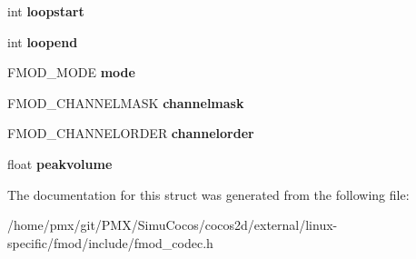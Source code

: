 \begin{DoxyCompactItemize}
int {\bfseries loopstart}
\item 
\mbox{\label{structFMOD__CODEC__WAVEFORMAT_af6fe45ead433ef4bdb8d3e74859900f2}} 
int {\bfseries loopend}
\item 
\mbox{\label{structFMOD__CODEC__WAVEFORMAT_a1f23ba212c380e08e9d0b83f16a00320}} 
F\+M\+O\+D\+\_\+\+M\+O\+DE {\bfseries mode}
\item 
\mbox{\label{structFMOD__CODEC__WAVEFORMAT_a5ef3ccd8b66efab89177fb7f02de8a3e}} 
F\+M\+O\+D\+\_\+\+C\+H\+A\+N\+N\+E\+L\+M\+A\+SK {\bfseries channelmask}
\item 
\mbox{\label{structFMOD__CODEC__WAVEFORMAT_a95f5ba661ea00c1a6ab06092f9bc9fac}} 
F\+M\+O\+D\+\_\+\+C\+H\+A\+N\+N\+E\+L\+O\+R\+D\+ER {\bfseries channelorder}
\item 
\mbox{\label{structFMOD__CODEC__WAVEFORMAT_a4bf4a9aeb4628e4eec7ff239453bb4e7}} 
float {\bfseries peakvolume}
\end{DoxyCompactItemize}


The documentation for this struct was generated from the following file\+:\begin{DoxyCompactItemize}
\item 
/home/pmx/git/\+P\+M\+X/\+Simu\+Cocos/cocos2d/external/linux-\/specific/fmod/include/fmod\+\_\+codec.\+h\end{DoxyCompactItemize}
